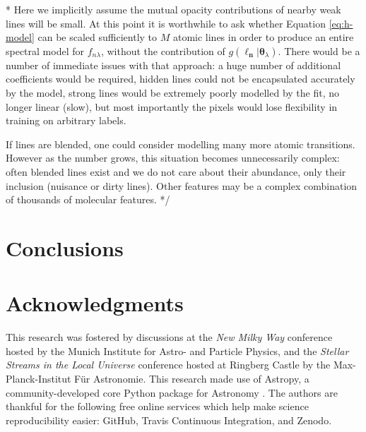 \documentclass[useAMS,usenatbib]{mn2e}
\newcommand\lv{\mathbf{\boldsymbol\ell_n}}
\newcommand\cv{{\boldsymbol\theta}_\lambda}
\newcommand\given{|}
\begin{document}




\/* 
Here we implicitly assume the mutual opacity contributions of nearby weak lines will be small. 
At this point it is worthwhile to ask whether Equation \ref{eq:h-model} can be scaled sufficiently to $M$ atomic lines in order to produce an entire spectral model for $f_{n\lambda}$, without the contribution of $g\left(\lv\given\cv\right)$. There would be a number of immediate issues with that approach: a huge number of additional coefficients would be required, hidden lines could not be encapsulated accurately by the model, strong lines would be extremely poorly modelled by the fit, no longer linear (slow), but most importantly the pixels would lose flexibility in training on arbitrary labels. 

If lines are blended, one could consider modelling many more atomic transitions.
However as the number grows, this situation becomes unnecessarily complex:
often blended lines exist and we do not care about their abundance, only their
inclusion (nuisance or dirty lines). Other features may be a complex combination
of thousands of molecular features.
*/


\section{Conclusions}

% 


\section*{Acknowledgments}
This research was fostered by discussions at the \textit{New Milky Way}
conference hosted by the Munich Institute for Astro- and Particle Physics, and
the \textit{Stellar Streams in the Local Universe} conference hosted at Ringberg
Castle by the Max-Planck-Institut F\"ur Astronomie. This research made use of 
Astropy, a community-developed core Python package for Astronomy \citep{astropy}.
The authors are thankful for the following free online services which help make
science reproducibility easier: GitHub, Travis Continuous Integration, and Zenodo.
\end{document}
